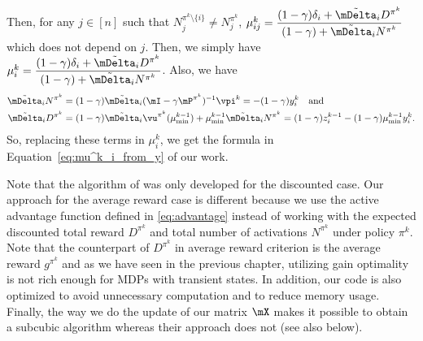 Then, for any $j\in[n]$ such that $N_j^{\pi^k\setminus\{i\}}\neq N_j^{\pi^k}$, $\mu^k_{ij}=\displaystyle\frac{(1-\gamma)\delta_i +\tilde{\mDelta}_iD^{\pi^k}}{(1-\gamma) +\tilde{\mDelta}_iN^{\pi^k}}$ which does not depend on $j$.
Then, we simply have ${\mu^k_i=\displaystyle\frac{(1-\gamma)\delta_i +\tilde{\mDelta}_iD^{\pi^k}}{(1-\gamma) +\tilde{\mDelta}_iN^{\pi^k}}}$. %
Also, we have 
\begin{align*}
    \tilde{\mDelta}_iN^{\pi^k}&=(1-\gamma)\tilde{\mDelta}_i(\mI-\gamma \mP^{\pi^k})^{-1}\vpi^k=-(1-\gamma)y^k_i \quad\text{and}\\
    \tilde{\mDelta}_iD^{\pi^k}&={(1-\gamma)\tilde{\mDelta}_i\vu^{\pi^k}(\mu^{k-1}_{\min}) +\mu^{k-1}_{\min}\tilde{\mDelta}_i N^{\pi^k}} =(1-\gamma)z^{k-1}_i -(1-\gamma)\mu^{k-1}_{\min}y^k_i.
\end{align*}
So, replacing these terms in $\mu^k_i$, we get the formula in Equation~\eqref{eq:mu^k_i_from_y} of our work.

Note that the algorithm of \cite{akbarzadeh2020conditions} was only developed for the discounted case.  Our approach for the average reward case is different because we use the active advantage function defined in \eqref{eq:advantage} instead of working with the expected discounted total reward $D^{\pi^k}$ and total number of activations $N^{\pi^k}$ under policy $\pi^k$. 
Note that the counterpart of $D^{\pi^k}$ in average reward criterion is the average reward $g^{\pi^k}$ and as we have seen in the previous chapter, utilizing gain optimality is not rich enough for MDPs with transient states.
In addition, our code is also optimized to avoid unnecessary computation and to reduce memory usage. Finally, the way we do the update of our matrix $\mX$ makes it possible to obtain a subcubic algorithm whereas their approach does not (see also below).

